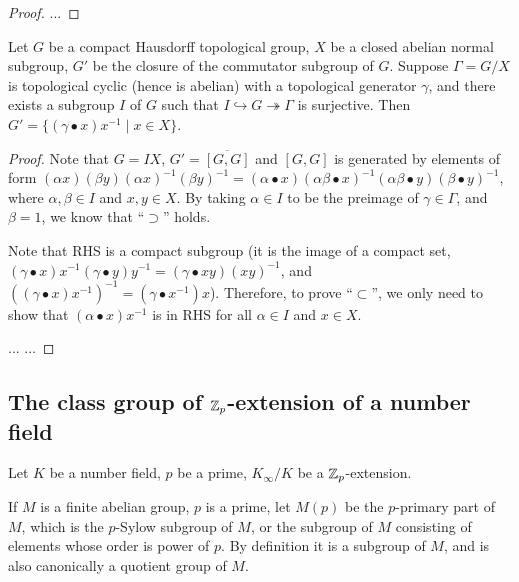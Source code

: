 \begin{proof}
...
\end{proof}

\begin{lem}
\label{commutator-eq}
Let $G$ be a compact Hausdorff
topological group, $X$ be a closed abelian normal subgroup,
$G'$ be the closure of the commutator subgroup of $G$.
Suppose $\Gamma=G/X$ is topological cyclic (hence is abelian)
with a topological generator $\gamma$,
and there exists a subgroup $I$ of $G$
such that $I\hookrightarrow G\twoheadrightarrow\Gamma$ is surjective.
Then $G'=\{(\gamma\bullet x)x^{-1}\mid x\in X\}$.
\end{lem}

\begin{proof}
Note that $G=IX$, $G'=\overline{[G,G]}$
and $[G,G]$ is generated by elements of form
$(\alpha x)(\beta y)(\alpha x)^{-1}(\beta y)^{-1}
=(\alpha\bullet x)(\alpha\beta\bullet x)^{-1}(\alpha\beta\bullet y)(\beta\bullet y)^{-1}$,
where $\alpha,\beta\in I$ and $x,y\in X$.
By taking $\alpha\in I$ to be the preimage of $\gamma\in\Gamma$, and $\beta=1$,
we know that ``$\supset$'' holds.

Note that RHS is a compact subgroup
(it is the image of a compact set,
$(\gamma\bullet x)x^{-1}(\gamma\bullet y)y^{-1}
=(\gamma\bullet xy)(xy)^{-1}$,
and $((\gamma\bullet x)x^{-1})^{-1}
=(\gamma\bullet x^{-1})x$).
Therefore, to prove ``$\subset$'', we only need to show that
$(\alpha\bullet x)x^{-1}$ is in RHS for all $\alpha\in I$ and $x\in X$.

... ...
\end{proof}

\subsection{The class group of ${\mathbb {Z}}_p$-extension of a number field}

Let $K$ be a number field, $p$ be a prime,
$K_\infty/K$ be a ${\mathbb {Z}}_p$-extension.

\begin{definition}
\label{p-primary-part}
If $M$ is a finite abelian group, $p$ is a prime, let $M(p)$ be the $p$-primary
part of $M$, which is the $p$-Sylow subgroup of $M$, or the subgroup of $M$
consisting of elements whose order is power of $p$.
By definition it is a subgroup of $M$, and is also canonically a quotient group of $M$.
\end{definition}

